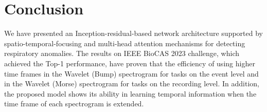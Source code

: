 \documentclass[conference]{IEEEtran}
\begin{document}
\section{Conclusion}
\label{conclusion}
We have presented an Inception-residual-based network architecture supported by spatio-temporal-focusing and multi-head attention mechanisms for detecting respiratory anomalies. 
The results on IEEE BioCAS 2023 challenge, which  achieved the Top-1 performance, have proven that the efficiency of using higher time frames in the Wavelet (Bump) spectrogram for tasks on the event level and in the Wavelet (Morse) spectrogram for tasks on the recording level. 
In addition, the proposed model shows its ability in learning temporal information when the time frame of each spectrogram is extended. 



	


%
%
%
\end{document}
